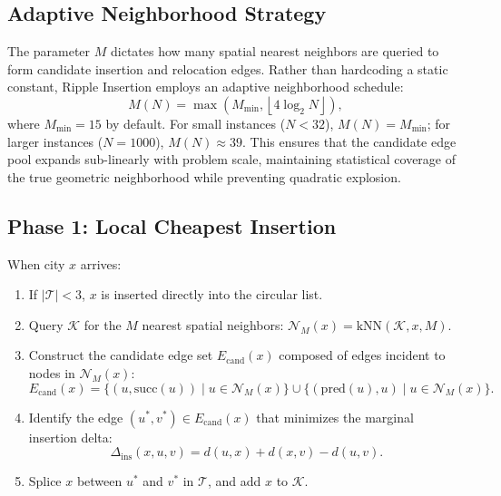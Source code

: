 \documentclass{article}
\theoremstyle{definition}
\begin{document}
\subsection{Adaptive Neighborhood Strategy}

The parameter $M$ dictates how many spatial nearest neighbors are queried to form candidate insertion and relocation edges. Rather than hardcoding a static constant, Ripple Insertion employs an adaptive neighborhood schedule:
\begin{equation}
M(N) = \max\left(M_{\min}, \left\lfloor 4 \log_2 N \right\rfloor\right),
\end{equation}
where $M_{\min} = 15$ by default. For small instances ($N < 32$), $M(N) = M_{\min}$; for larger instances ($N = 1000$), $M(N) \approx 39$. This ensures that the candidate edge pool expands sub-linearly with problem scale, maintaining statistical coverage of the true geometric neighborhood while preventing quadratic explosion.

\subsection{Phase 1: Local Cheapest Insertion}

When city $x$ arrives:
\begin{enumerate}
    \item If $|\mathcal{T}| < 3$, $x$ is inserted directly into the circular list.
    \item Query $\mathcal{K}$ for the $M$ nearest spatial neighbors: $\mathcal{N}_M(x) = \text{kNN}(\mathcal{K}, x, M)$.
    \item Construct the candidate edge set $E_{\text{cand}}(x)$ composed of edges incident to nodes in $\mathcal{N}_M(x)$:
    \begin{equation}
    E_{\text{cand}}(x) = \{(u, \text{succ}(u)) \mid u \in \mathcal{N}_M(x)\} \cup \{(\text{pred}(u), u) \mid u \in \mathcal{N}_M(x)\}.
    \end{equation}
    \item Identify the edge $(u^*, v^*) \in E_{\text{cand}}(x)$ that minimizes the marginal insertion delta:
    \begin{equation}
    \Delta_{\text{ins}}(x, u, v) = d(u, x) + d(x, v) - d(u, v).
    \end{equation}
    \item Splice $x$ between $u^*$ and $v^*$ in $\mathcal{T}$, and add $x$ to $\mathcal{K}$.
\end{enumerate}
\end{document}
